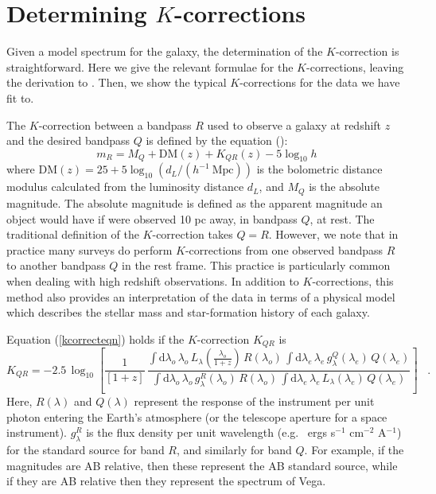 \documentclass[10pt,preprint]{aastex}
\newcommand{\lambdaobs}{\lambda_o}
\newcommand{\lambdaemit}{\lambda_e}
\renewcommand{\AA}{A}
\begin{document}
\section{Determining $K$-corrections}
\label{kcorrect}

Given a model spectrum for the galaxy, the determination of the
$K$-correction is straightforward. Here we give the relevant formulae
for the $K$-corrections, leaving the derivation to \citet{hogg02a}.
Then, we show the typical $K$-corrections for the data we have fit
to. 

The $K$-correction between a bandpass $R$ used to observe a galaxy at
redshift $z$ and the desired bandpass $Q$ is defined by the equation
(\citealt{oke68a, hogg02a}):
\begin{equation}
\label{kcorrecteqn}
m_R = M_Q + \mathrm{DM}(z) + K_{QR}(z) - 5 \log_{10} h 
\end{equation}
where $\mathrm{DM}(z) = 25 + 5\log_{10} (d_L /
(h^{-1}{\mathrm{~Mpc}}))$ is the bolometric distance modulus
calculated from the luminosity distance $d_L$, and $M_Q$ is the
absolute magnitude. The absolute magnitude is defined as the apparent
magnitude an object would have if were observed 10 pc away, in
bandpass $Q$, at rest.  The traditional definition of the
$K$-correction takes $Q=R$. However, we note that in practice many
surveys do perform $K$-corrections from one observed bandpass $R$ to
another bandpass $Q$ in the rest frame. This practice is particularly
common when dealing with high redshift observations.  In addition to
$K$-corrections, this method also provides an interpretation of the
data in terms of a physical model which describes the stellar mass and
star-formation history of each galaxy.

Equation (\ref{kcorrecteqn}) holds if the $K$-correction $K_{QR}$ is
\begin{equation}
\label{eq:wavelengthL}
K_{QR} = -2.5\,\log_{10}\left[\frac{1}{[1+z]}\,
  \frac{\displaystyle
  \int\mathrm{d}\lambdaobs\,\lambdaobs\,L_{\lambda}\!\left(\frac{\lambdaobs}{1+z}\right)\,R(\lambdaobs)\,
    \int\mathrm{d}\lambdaemit\,\lambdaemit\,
    g^Q_{\lambda}(\lambdaemit)\,Q(\lambdaemit)}
       {\displaystyle
  \int\mathrm{d}\lambdaobs\,\lambdaobs\,g^R_{\lambda}(\lambdaobs)\,R(\lambdaobs)\,
    \int\mathrm{d}\lambdaemit\,\lambdaemit\,
    L_{\lambda}(\lambdaemit)\,Q(\lambdaemit)}
\right] \;\;\;.
\end{equation}
Here, $R(\lambda)$ and $Q(\lambda)$ represent the response of the
instrument per unit photon entering the Earth's atmosphere (or the
telescope aperture for a space instrument).  $g^R_\lambda$ is the flux
density per unit wavelength (e.g.~ ergs s$^{-1}$ cm$^{-2}$ \AA$^{-1}$)
for the standard source for band $R$, and similarly for band $Q$. For
example, if the magnitudes are AB relative, then these represent the
AB standard source, while if they are AB relative then they represent
the spectrum of Vega. 
\end{document}
